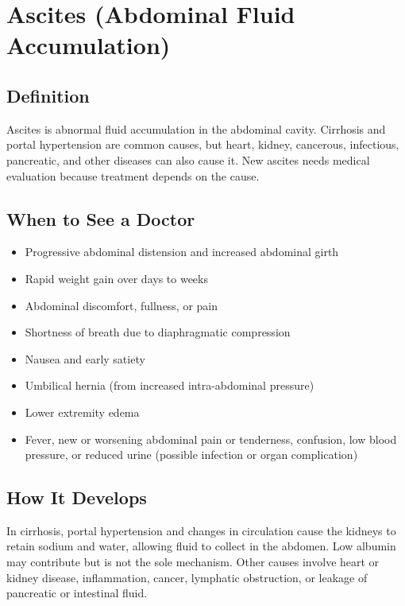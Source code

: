 \chapter{Ascites (Abdominal Fluid Accumulation)}

\section*{Definition}
Ascites is abnormal fluid accumulation in the abdominal cavity. Cirrhosis and portal hypertension are common causes, but heart, kidney, cancerous, infectious, pancreatic, and other diseases can also cause it. New ascites needs medical evaluation because treatment depends on the cause.

\section*{When to See a Doctor}
\begin{itemize}
\item Progressive abdominal distension and increased abdominal girth
\item Rapid weight gain over days to weeks
\item Abdominal discomfort, fullness, or pain
\item Shortness of breath due to diaphragmatic compression
\item Nausea and early satiety
\item Umbilical hernia (from increased intra-abdominal pressure)
\item Lower extremity edema
\item Fever, new or worsening abdominal pain or tenderness, confusion, low blood pressure, or reduced urine (possible infection or organ complication)
\end{itemize}

\section*{How It Develops}
In cirrhosis, portal hypertension and changes in circulation cause the kidneys to retain sodium and water, allowing fluid to collect in the abdomen. Low albumin may contribute but is not the sole mechanism. Other causes involve heart or kidney disease, inflammation, cancer, lymphatic obstruction, or leakage of pancreatic or intestinal fluid.

